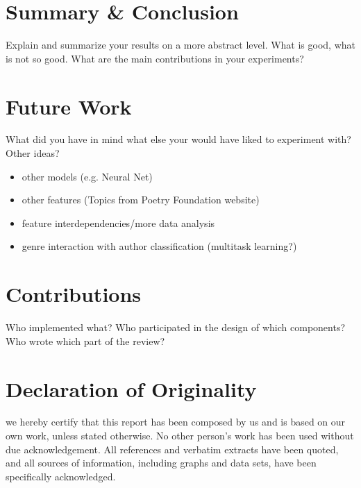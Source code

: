 \documentclass[11pt]{article}
\begin{document}
\section{Summary \& Conclusion}

Explain and summarize your results on a more abstract level. What is good, what is not so
good. What are the main contributions in your experiments?


\section{Future Work}

What did you have in mind what else your
would have liked to experiment with? Other ideas?
\begin{itemize}
\item other models (e.g. Neural Net)
\item other features (Topics from Poetry Foundation website)
\item feature interdependencies/more data analysis
\item genre interaction with author classification (multitask learning?)
\end{itemize}





\appendix

\section{Contributions}
Who implemented what?
Who participated in the design of which components?
Who wrote which part of the review?
\section{Declaration of Originality}
we hereby certify that this report has been composed by us and is based on our own work, unless 
stated otherwise. No other person’s work has been used without due acknowledgement. All references 
and verbatim extracts have been quoted, and all sources of information, including graphs and data 
sets, have been specifically acknowledged.
\label{sec:appendix}
\end{document}
